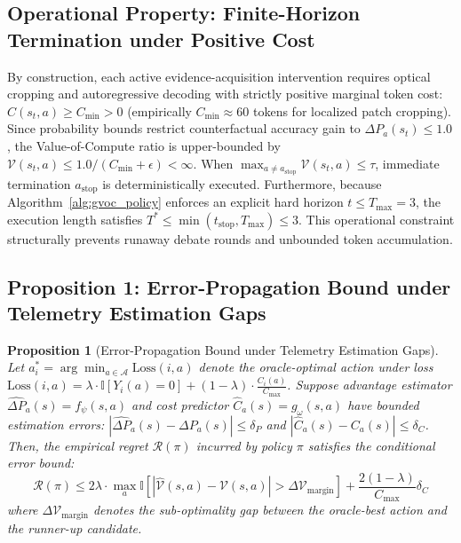 \documentclass[11pt]{article}
\newtheorem{proposition}[theorem]{Proposition}
\begin{document}
\subsection{Operational Property: Finite-Horizon Termination under Positive Cost}
By construction, each active evidence-acquisition intervention requires optical cropping and autoregressive decoding with strictly positive marginal token cost: $C(s_t, a) \ge C_{\min} > 0$ (empirically $C_{\min} \approx 60$ tokens for localized patch cropping). Since probability bounds restrict counterfactual accuracy gain to $\Delta P_a(s_t) \le 1.0$, the Value-of-Compute ratio is upper-bounded by $\mathcal{V}(s_t, a) \le 1.0 / (C_{\min} + \epsilon) < \infty$. When $\max_{a \neq a_{\text{stop}}} \mathcal{V}(s_t, a) \le \tau$, immediate termination $a_{\text{stop}}$ is deterministically executed. Furthermore, because Algorithm~\ref{alg:gvoc_policy} enforces an explicit hard horizon $t \le T_{\max} = 3$, the execution length satisfies $T^* \le \min(t_{\text{stop}}, T_{\max}) \le 3$. This operational constraint structurally prevents runaway debate rounds and unbounded token accumulation.

\subsection{Proposition 1: Error-Propagation Bound under Telemetry Estimation Gaps}

\begin{proposition}[Error-Propagation Bound under Telemetry Estimation Gaps]
Let $a^*_i = \arg\min_{a \in \mathcal{A}} \text{Loss}(i, a)$ denote the oracle-optimal action under loss $\text{Loss}(i, a) = \lambda \cdot \mathbb{I}[Y_i(a) = 0] + (1 - \lambda) \cdot \frac{C_i(a)}{C_{\max}}$. Suppose advantage estimator $\hat{\Delta P}_a(s) = f_\psi(s, a)$ and cost predictor $\hat{C}_a(s) = g_\omega(s, a)$ have bounded estimation errors: $|\hat{\Delta P}_a(s) - \Delta P_a(s)| \le \delta_P$ and $|\hat{C}_a(s) - C_a(s)| \le \delta_C$. Then, the empirical regret $\mathcal{R}(\pi)$ incurred by policy $\pi$ satisfies the conditional error bound:
\begin{equation}
\mathcal{R}(\pi) \le 2\lambda \cdot \max_a \mathbb{I}[|\hat{\mathcal{V}}(s, a) - \mathcal{V}(s, a)| > \Delta \mathcal{V}_{\text{margin}}] + \frac{2(1 - \lambda)}{C_{\max}} \delta_C
\end{equation}
where $\Delta \mathcal{V}_{\text{margin}}$ denotes the sub-optimality gap between the oracle-best action and the runner-up candidate.
\end{proposition}
\end{document}
